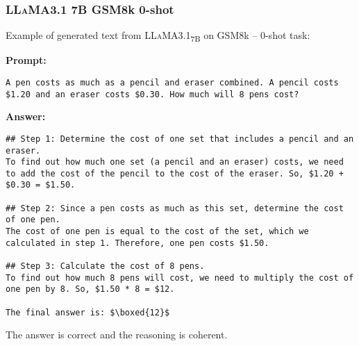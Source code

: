 \subsubsection*{\textsc{LLaMA}3.1 7B GSM8k 0-shot}
\noindent Example of generated text from \textsc{LLaMA}3.1\textsubscript{7B} on GSM8k -- 0-shot task:
\begin{displayquote}
	\textbf{Prompt:}
	\begin{Verbatim}[fontsize=\small,breaklines]
A pen costs as much as a pencil and eraser combined. A pencil costs $1.20 and an eraser costs $0.30. How much will 8 pens cost?
	\end{Verbatim}
	\textbf{Answer:}
	\begin{Verbatim}[fontsize=\small,breaklines]
## Step 1: Determine the cost of one set that includes a pencil and an eraser.
To find out how much one set (a pencil and an eraser) costs, we need to add the cost of the pencil to the cost of the eraser. So, $1.20 + $0.30 = $1.50.

## Step 2: Since a pen costs as much as this set, determine the cost of one pen.
The cost of one pen is equal to the cost of the set, which we calculated in step 1. Therefore, one pen costs $1.50.

## Step 3: Calculate the cost of 8 pens.
To find out how much 8 pens will cost, we need to multiply the cost of one pen by 8. So, $1.50 * 8 = $12.

The final answer is: $\boxed{12}$
	\end{Verbatim}
\end{displayquote}
The answer is correct and the reasoning is coherent.
